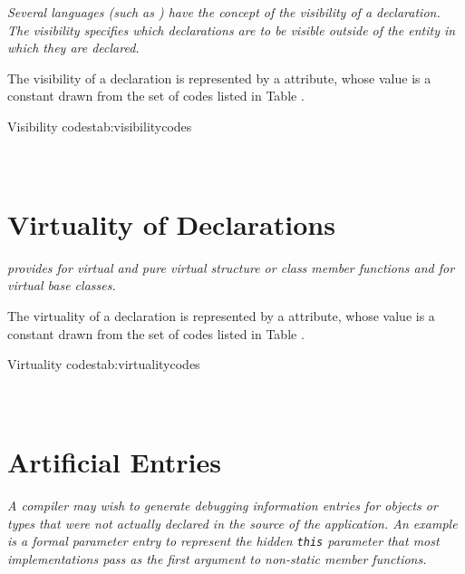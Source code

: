 \textit{Several languages (such as ) 
have the concept of the visibility of a declaration. The
visibility specifies which declarations are to be 
visible outside of the entity in which they are
declared.}

The 
\hypertarget{chap:DWATvisibilityvisibilityofdeclaration}{}
visibility of a declaration is represented 
by a \DWATvisibility{}
attribute, whose value is a
constant drawn from the set of codes listed in 
Table .

\begin{simplenametable}[1.5in]{Visibility codes}{tab:visibilitycodes}
\DWVISlocalTARG{}          \\
\DWVISexportedTARG{}    \\
\DWVISqualifiedTARG{}  \\
\end{simplenametable}

\section{Virtuality of Declarations}
\label{chap:virtualityofdeclarations}
\textit{ provides for virtual and pure virtual structure or class
member functions and for virtual base classes.}

The 
\hypertarget{chap:DWATvirtualityvirtualityindication}{}
virtuality of a declaration is represented by a
\DWATvirtuality{}
attribute, whose value is a constant drawn
from the set of codes listed in 
Table .

\begin{simplenametable}[2.5in]{Virtuality codes}{tab:virtualitycodes}
\DWVIRTUALITYnoneTARG{}                      \\
\DWVIRTUALITYvirtualTARG{}                \\
\DWVIRTUALITYpurevirtualTARG{}    \\
\end{simplenametable}

\section{Artificial Entries}
\label{chap:artificialentries}
\textit{A compiler may wish to generate debugging information entries
for objects or types that were not actually declared in the
source of the application. An example is a formal parameter
entry to represent the hidden 
\texttt{this} parameter
that most  implementations pass as the first argument 
to non-static member functions.}  

